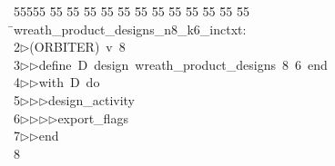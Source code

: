 %
%
\begin{tabbing}
55555 \= 55 \= 55 \= 55 \= 55 \= 55 \= 55 \= 55 \= 55 \= 55 \= 55 \= 55 \= 55 \= \>wreath\_product\_designs\_n8\_k6\_inctxt:\\[0pt]
2\>$\triangleright$\>(ORBITER)\ v\ 8\ \\[0pt]
3\>$\triangleright$\>$\triangleright$\>define\ D\ design\ wreath\_product\_designs\ 8\ 6\ end\ \\[0pt]
4\>$\triangleright$\>$\triangleright$\>with\ D\ do\ \\[0pt]
5\>$\triangleright$\>$\triangleright$\>$\triangleright$\>design\_activity\ \\[0pt]
6\>$\triangleright$\>$\triangleright$\>$\triangleright$\>$\triangleright$\>export\_flags\ \\[0pt]
7\>$\triangleright$\>$\triangleright$\>end\\[0pt]
8\>\end{tabbing}

